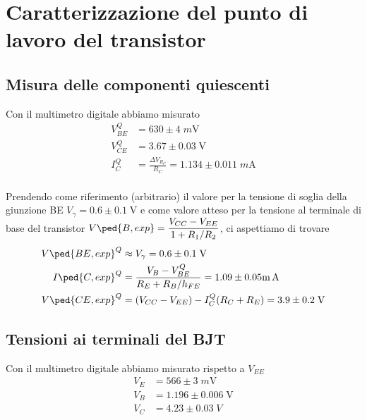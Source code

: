 \documentclass[10pt,a4paper]{article}
\begin{document}
\section{Caratterizzazione del punto di lavoro del transistor}
\subsection{Misura delle componenti quiescenti}
Con il multimetro digitale abbiamo misurato
\begin{align*}
V_{BE}^Q &= 630 \pm 4 \; \si{m\V} \\
V_{CE}^Q &= 3.67 \pm 0.03 \; \si{\V} \\
I_C^Q &= \frac{\Delta V_{R_C}}{R_C} = 1.134 \pm 0.011 \; \si{m\A} \\
\end{align*}

Prendendo come riferimento (arbitrario) il valore per la tensione di soglia
della giunzione BE $V_\gamma = 0.6 \pm 0.1 \; \si{\V}$ e come valore atteso
per la tensione al terminale di base del transistor
$\ds V\ped{B, exp} = \frac{V_{CC} - V_{EE}}{1 + R_1/R_2}$, ci aspettiamo di
trovare
\begin{align*}
V\ped{BE, exp}^Q &\approx V_\gamma = 0.6 \pm 0.1 \; \si{\V} \\
I\ped{C, exp}^Q &= \frac{V_B - V_{BE}^Q}{R_E + R_B/h_{FE}} =
1.09 \pm 0.05 \si{\m\A} \\
V\ped{CE, exp}^Q &= (V_{CC} - V_{EE}) - I_C^Q(R_C + R_E) = 3.9 \pm 0.2 \;
\si{\V}
\end{align*}

\subsection{Tensioni ai terminali del BJT}
Con il multimetro digitale abbiamo misurato rispetto a $V_{EE}$
\begin{align*}
V_E &= 566 \pm 3 \; \si{m\V} \\
V_B &= 1.196 \pm 0.006 \; \si{\V} \\
V_C &= 4.23 \pm 0.03 \; \si{V} \\
\end{align*}

\end{document}
